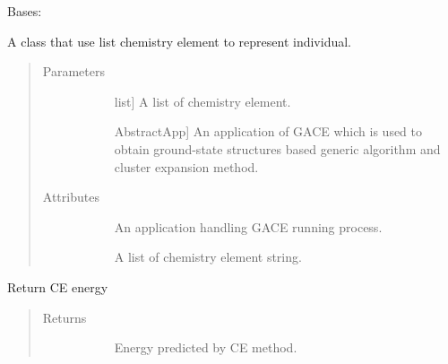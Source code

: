 \documentclass[letterpaper,10pt,english]{sphinxmanual}
\begin{document}
\begin{fulllineitems}
\label{\detokenize{pygace:pygace.general_gace.GeneralEleIndv}}
Bases: {\hyperref[\detokenize{pygace:pygace.utility.EleIndv}]{}}

A class that use list chemistry element to represent individual.
\begin{quote}\begin{description}
\item[{Parameters}] \leavevmode\begin{description}
\item[{}] \leavevmode{[}list{]}
A list of chemistry element.

\item[{}] \leavevmode{[}AbstractApp{]}
An application of GACE which is used to obtain ground-state
structures based generic algorithm and cluster expansion method.

\end{description}

\item[{Attributes}] \leavevmode\begin{description}
\item[{}] \leavevmode
An application handling GACE running process.

\item[{}] \leavevmode
A list of chemistry element string.

\end{description}

\end{description}\end{quote}

\begin{fulllineitems}
\label{\detokenize{pygace:pygace.general_gace.GeneralEleIndv.ce_energy}}
Return CE energy
\begin{quote}\begin{description}
\item[{Returns}] \leavevmode\begin{description}
\item[{}] \leavevmode
Energy predicted by CE method.


\end{description}
\end{description}
\end{quote}
\end{fulllineitems}
\end{fulllineitems}
\end{document}
